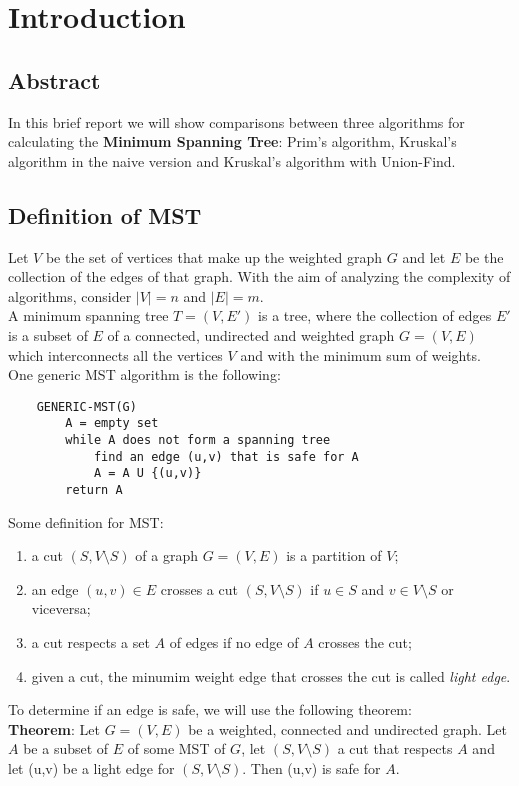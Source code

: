 \section{Introduction}


\subsection{Abstract}
In this brief report we will show comparisons between three algorithms for calculating the \textbf{Minimum Spanning Tree}: Prim's algorithm, Kruskal's algorithm in the naive version and Kruskal's algorithm with Union-Find.

\subsection{Definition of MST}
Let $V$ be the set of vertices that make up the weighted graph $G$ and let $E$ be the collection of the edges of that graph. With the aim of analyzing the complexity of algorithms, consider $|V| = n$ and $|E| = m$. \\
A minimum spanning tree $T = (V,E')$ is a tree, where the collection of edges $E'$ is a subset of $E$ of a connected, undirected and weighted graph $G = (V,E)$ which interconnects all the vertices $V$ and with the minimum sum of weights. \\
\noindent
One generic MST algorithm is the following: 
\begin{verbatim}
    GENERIC-MST(G)
        A = empty set
        while A does not form a spanning tree
            find an edge (u,v) that is safe for A
            A = A U {(u,v)}
        return A
\end{verbatim}
\noindent
Some definition for MST:
\begin{enumerate}
    \item a cut $(S, V \setminus S)$ of a graph $G = (V, E)$ is a partition of $V$;
    \item an edge $(u,v) \in E$ crosses a cut $(S, V \setminus S)$ if $u\in S$ and $v \in V \setminus S$ or viceversa;
    \item a cut respects a set $A$ of edges if no edge of $A$ crosses the cut;
    \item given a cut, the minumim weight edge that crosses the cut is called \textit{light edge}.
\end{enumerate}
\noindent
To determine if an edge is safe, we will use the following theorem: \\ \noindent
\textbf{Theorem}: Let $G = (V,E)$ be a weighted, connected and undirected graph. Let $A$ be a subset of $E$ of some MST of $G$, let $(S, V \setminus S)$ a cut that respects $A$ and let (u,v) be a light edge for $(S, V \setminus S)$. Then (u,v) is safe for $A$.